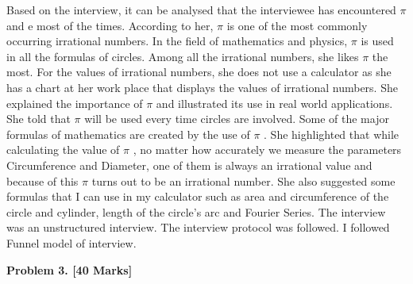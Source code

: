\documentclass[12pt]{article}
\begin{document}
\begin{justify}
Based on the interview, it can be analysed that the interviewee has encountered $ \pi $  and e most of the times. According to her, $ \pi $  is one of the most commonly occurring irrational numbers. In the field of mathematics and physics, $ \pi $  is used in all the formulas of circles. Among all the irrational numbers, she likes $ \pi $  the most. For the values of irrational numbers, she does not use a calculator as she has a chart at her work place that displays the values of irrational numbers. She explained the importance of $ \pi $  and illustrated its use in real world applications. She told that $ \pi $  will be used every time circles are involved. Some of the major formulas of mathematics are created by the use of $ \pi $ . She highlighted that while calculating the value of $ \pi $ , no matter how accurately we measure the parameters Circumference and Diameter, one of them is always an irrational value and because of this $ \pi $  turns out to be an irrational number. She also suggested some formulas that I can use in my calculator such as area and circumference of the circle and cylinder, length of the circle’s arc and Fourier Series. The interview was an unstructured interview. The interview protocol was followed. I followed Funnel model of interview.
\end{justify}\par


\vspace{\baselineskip}

\vspace{\baselineskip}
\begin{justify}
{\fontsize{14pt}{16.8pt}\selectfont \textbf{Problem 3. [40 Marks]}\par}
\end{justify}\par



\end{document}

